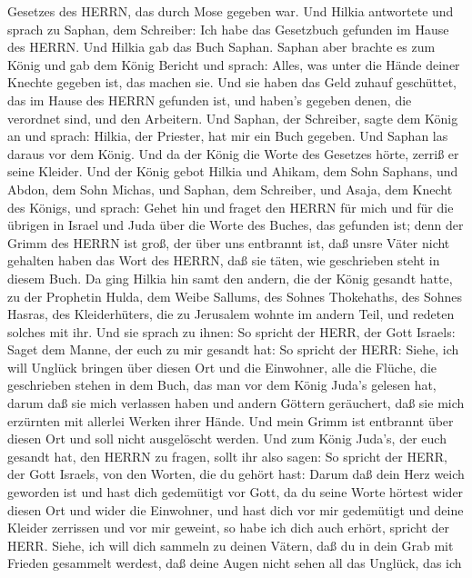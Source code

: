 Gesetzes des HERRN, das durch Mose gegeben war.  Und Hilkia
antwortete und sprach zu Saphan, dem Schreiber: Ich habe das Gesetzbuch
gefunden im Hause des HERRN. Und Hilkia gab das Buch Saphan.
 Saphan aber brachte es zum König und gab dem König Bericht
und sprach: Alles, was unter die Hände deiner Knechte gegeben ist, das
machen sie.  Und sie haben das Geld zuhauf geschüttet, das
im Hause des HERRN gefunden ist, und haben's gegeben denen, die
verordnet sind, und den Arbeitern.  Und Saphan, der
Schreiber, sagte dem König an und sprach: Hilkia, der Priester, hat mir
ein Buch gegeben. Und Saphan las daraus vor dem König.  Und
da der König die Worte des Gesetzes hörte, zerriß er seine Kleider.
 Und der König gebot Hilkia und Ahikam, dem Sohn Saphans,
und Abdon, dem Sohn Michas, und Saphan, dem Schreiber, und Asaja, dem
Knecht des Königs, und sprach:  Gehet hin und fraget den
HERRN für mich und für die übrigen in Israel und Juda über die Worte des
Buches, das gefunden ist; denn der Grimm des HERRN ist groß, der über
uns entbrannt ist, daß unsre Väter nicht gehalten haben das Wort des
HERRN, daß sie täten, wie geschrieben steht in diesem Buch.
 Da ging Hilkia hin samt den andern, die der König gesandt
hatte, zu der Prophetin Hulda, dem Weibe Sallums, des Sohnes Thokehaths,
des Sohnes Hasras, des Kleiderhüters, die zu Jerusalem wohnte im andern
Teil, und redeten solches mit ihr.  Und sie sprach zu
ihnen: So spricht der HERR, der Gott Israels: Saget dem Manne, der euch
zu mir gesandt hat:  So spricht der HERR: Siehe, ich will
Unglück bringen über diesen Ort und die Einwohner, alle die Flüche, die
geschrieben stehen in dem Buch, das man vor dem König Juda's gelesen
hat,  darum daß sie mich verlassen haben und andern Göttern
geräuchert, daß sie mich erzürnten mit allerlei Werken ihrer Hände. Und
mein Grimm ist entbrannt über diesen Ort und soll nicht ausgelöscht
werden.  Und zum König Juda's, der euch gesandt hat, den
HERRN zu fragen, sollt ihr also sagen: So spricht der HERR, der Gott
Israels, von den Worten, die du gehört hast:  Darum daß
dein Herz weich geworden ist und hast dich gedemütigt vor Gott, da du
seine Worte hörtest wider diesen Ort und wider die Einwohner, und hast
dich vor mir gedemütigt und deine Kleider zerrissen und vor mir geweint,
so habe ich dich auch erhört, spricht der HERR.  Siehe, ich
will dich sammeln zu deinen Vätern, daß du in dein Grab mit Frieden
gesammelt werdest, daß deine Augen nicht sehen all das Unglück, das ich
